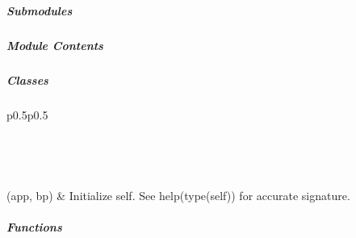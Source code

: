 \documentclass[letterpaper,10pt,english]{sphinxmanual}
\begin{document}
\subparagraph{Submodules}
\label{\detokenize{autoapi/pine/backend/auth/index:submodules}}

\subparagraph{}
\label{\detokenize{autoapi/pine/backend/auth/bp/index:module-pine.backend.auth.bp}}\label{\detokenize{autoapi/pine/backend/auth/bp/index:pine-backend-auth-bp}}\label{\detokenize{autoapi/pine/backend/auth/bp/index::doc}}

\subparagraph{Module Contents}
\label{\detokenize{autoapi/pine/backend/auth/bp/index:module-contents}}

\subparagraph{Classes}
\label{\detokenize{autoapi/pine/backend/auth/bp/index:classes}}

\begin{savenotes}\sphinxatlongtablestart\begin{longtable}[c]{p{0.5\linewidth}p{0.5\linewidth}}
\hline

\endfirsthead

%
{}\\
\hline

\endhead

\hline
{}\\
\endfoot

\endlastfoot

{\hyperref[\detokenize{autoapi/pine/backend/auth/bp/index:pine.backend.auth.bp.AuthModule}]{}}(app, bp)
&
Initialize self.  See help(type(self)) for accurate signature.
\\
\hline
\end{longtable}\sphinxatlongtableend\end{savenotes}


\subparagraph{Functions}
\label{\detokenize{autoapi/pine/backend/auth/bp/index:functions}}
\end{document}
